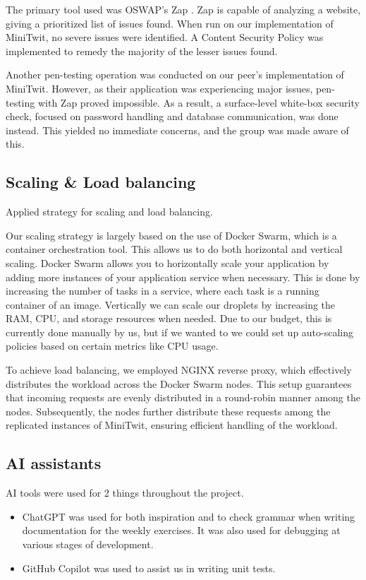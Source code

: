 The primary tool used was OSWAP's Zap \parencite{zap}. Zap is capable of analyzing a website, giving a prioritized list of issues found. When run on our implementation of MiniTwit, no severe issues were identified. A Content Security Policy was implemented to remedy the majority of the lesser issues found.

Another pen-testing operation was conducted on our peer's implementation of MiniTwit. However, as their application was experiencing major issues, pen-testing with Zap proved impossible. As a result, a surface-level white-box security check, focused on password handling and database communication, was done instead. This yielded no immediate concerns, and the group was made aware of this.

\subsection{Scaling \& Load balancing}
Applied strategy for scaling and load balancing.

Our scaling strategy is largely based on the use of Docker Swarm, which is a container orchestration tool. This allows us to do both horizontal and vertical scaling. Docker Swarm allows you to horizontally scale your application by adding more instances of your application service when necessary. This is done by increasing the number of tasks in a service, where each task is a running container of an image. Vertically we can scale our droplets by increasing the RAM, CPU, and storage resources when needed. Due to our budget, this is currently done manually by us, but if we wanted to we could set up auto-scaling policies based on certain metrics like CPU usage.

To achieve load balancing, we employed NGINX reverse proxy, which effectively distributes the workload across the Docker Swarm nodes. This setup guarantees that incoming requests are evenly distributed in a round-robin manner among the nodes. Subsequently, the nodes further distribute these requests among the replicated instances of MiniTwit, ensuring efficient handling of the workload.

\subsection{AI assistants}
AI tools were used for 2 things throughout the project.
\begin{itemize}
    \item ChatGPT \parencite{chatgpt} was used for both inspiration and to check grammar when writing documentation for the weekly exercises. It was also used for debugging at various stages of development. 
    \item GitHub Copilot \parencite{copilot} was used to assist us in writing unit tests.
\end{itemize}